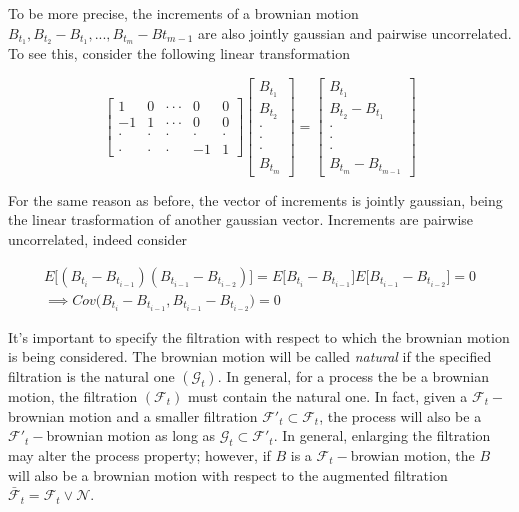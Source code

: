 To be more precise, the increments of a brownian motion $B_{t_1}, B_{t_2}-B_{t_1},...,B_{t_m}-B{t_{m-1}}$ are also jointly gaussian and pairwise uncorrelated. To see this, consider the following linear transformation

\begin{equation*}
    \begin{bmatrix}
        1 & 0 & \cdot\cdot\cdot & 0 & 0 \\
        -1 & 1 & \cdot\cdot\cdot & 0 & 0 \\
        \cdot & \cdot & \cdot &\cdot & \cdot \\
        \cdot & \cdot & \cdot & -1 & 1
    \end{bmatrix}
    \begin{bmatrix}
        B_{t_1} \\
        B_{t_2} \\
        \cdot \\
        \cdot \\
        \cdot \\
        B_{t_m}
    \end{bmatrix}
    = 
    \begin{bmatrix}
        B_{t_1} \\
        B_{t_2}-B_{t_1} \\
        \cdot \\
        \cdot \\
        \cdot \\
        B_{t_m}-B_{t_{m-1}}
    \end{bmatrix}
\end{equation*}

For the same reason as before, the vector of increments is jointly gaussian, being the linear trasformation of another gaussian vector. Increments are pairwise uncorrelated, indeed consider

\begin{gather*}
    E\Big[ (B_{t_i}-B_{t_{i-1}}) (B_{t_{i-1}}-B_{t_{i-2}}) \Big] = E \Big[ B_{t_i} - B_{t_{i-1}} \Big] E \Big[ B_{t_{i-1}} - B_{t_{i-2}} \Big] = 0 \\
    \implies Cov\Big( B_{t_i}-B_{t_{i-1}}, B_{t_{i-1}}-B_{t_{i-2}} \Big) = 0
\end{gather*}

It's important to specify the filtration with respect to which the brownian motion is being considered. The brownian motion will be called \textit{natural} if the specified filtration is the natural one $(\mathcal{G}_t)$. In general, for a process the be a brownian motion, the filtration $(\mathcal{F}_t)$ must contain the natural one. In fact, given a $\mathcal{F}_t-$brownian motion and a smaller filtration $\mathcal{F}'_t \subset \mathcal{F}_t$, the process will also be a $\mathcal{F}'_t-$brownian motion as long as $\mathcal{G}_t \subset \mathcal{F}'_t$. In general, enlarging the filtration may alter the process property; however, if $B$ is a $\mathcal{F}_t-$browian motion, the $B$ will also be a brownian motion with respect to the augmented filtration $\bar{\mathcal{F}}_t = \mathcal{F}_t \vee \mathcal{N}$.


